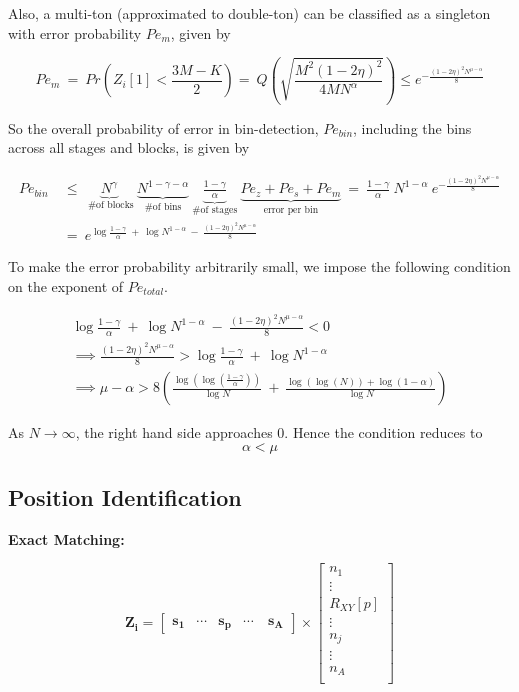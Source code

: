 Also, a multi-ton (approximated to double-ton) can be classified as a singleton with error probability $Pe_{m}$, given by

\[ 
Pe_{m} \ = \ Pr( Z_i[1] < \frac{3M-K}{2}) = \  Q \left ( \sqrt{\frac{M^2(1-2\eta)^2}{4 M N^{\alpha}}} \right ) \leq e^{- \frac{(1-2\eta)^2N^{\mu-\alpha}}{8}}
\]

So the overall probability of error in bin-detection, $Pe_{bin}$, including the bins across all stages and blocks, is given by

\[
\begin{array}{ll}
Pe_{bin} & \ \leq \   \underset{\text{ \# of blocks} }{\underbrace{N^{\gamma}}} \
\underset{\text{\# of bins} } {\underbrace{N^{1-\gamma-\alpha}}} \
\underset{\text{\# of stages} }
{\underbrace{\frac{1-\gamma}{\alpha}}} \  
\underset{\text{error per bin}}
{\underbrace{Pe_{z}+Pe_{s}+Pe_{m}}} \ = \ \frac{1-\gamma }{\alpha} \ N^{1-\alpha} \  e^{- \frac{(1-2\eta)^2N^{\mu-\alpha}}{8}} \\
& \ =  \ e^{\log \frac{1-\gamma }{\alpha} \ + \ \log N^{1-\alpha} \  - \ \frac{(1-2\eta)^2N^{\mu-\alpha}}{8}} 
\end{array}
\] 

To make the error probability arbitrarily small, we impose the following condition on the exponent of $Pe_{total}$.

\[\begin{array}{ll}
 \log \frac{1-\gamma }{\alpha} \ + \ \log N^{1-\alpha} \  - \ \frac{(1-2\eta)^2N^{\mu-\alpha}}{8} < 0 \\
\implies \frac{(1-2\eta)^2N^{\mu-\alpha}}{8} >   \log \frac{1-\gamma }{\alpha} \ + \ \log N^{1-\alpha}\\
\implies \mu-\alpha > 8 (\frac{\log (\log(\frac{1-\gamma}{\alpha}))}{\log N}\ + \ \frac{\log (\log(N)) + \log (1- \alpha)}{\log N} )
\end{array}
\]

As $N \rightarrow \infty$, the right hand side approaches 0. Hence the condition reduces to 
\[ \alpha < \mu \]


\subsection{Position Identification}
{\bf Exact Matching:}

\[
\mathbf{Z_i} = \begin{bmatrix}
\mathbf{s_1}       & \cdots   & \mathbf{s_p} &\cdots \ &\mathbf{s_A}
\end{bmatrix} \times
    \begin{bmatrix}
n_1 \\
\vdots \\
R_{XY}[p]\\
\vdots\\
n_j \\
\vdots\\
n_{A}\\
\end{bmatrix}
\]


